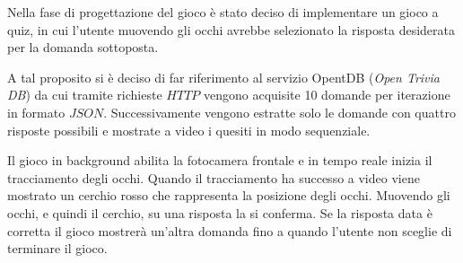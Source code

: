 Nella fase di progettazione del gioco è stato deciso di implementare un gioco a quiz, in cui l'utente muovendo gli occhi avrebbe selezionato la risposta desiderata per la domanda sottoposta.

A tal proposito si è deciso di far riferimento al servizio OpentDB\cite{opentdb} (\textit{Open Trivia DB}) da cui tramite richieste $HTTP$ vengono acquisite 10 domande per iterazione in formato $JSON$. Successivamente vengono estratte solo le domande con quattro risposte possibili e mostrate a video i quesiti in modo sequenziale.

Il gioco in background abilita la fotocamera frontale e in tempo reale inizia il tracciamento degli occhi. Quando il tracciamento ha successo a video viene mostrato un cerchio rosso che rappresenta la posizione degli occhi. Muovendo gli occhi, e quindi il cerchio, su una risposta la si conferma. Se la risposta data è corretta il gioco mostrerà un'altra domanda fino a quando l'utente non sceglie di terminare il gioco.

